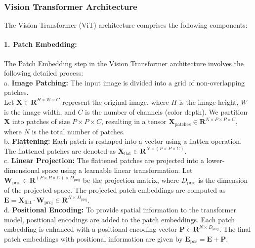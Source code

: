 \subsubsection{Vision Transformer Architecture}

The Vision Transformer (ViT) architecture comprises the following components:
\item
\paragraph{1. Patch Embedding:}
The Patch Embedding step in the Vision Transformer architecture involves the following detailed process:
\\

\noindent a. \textbf{Image Patching:} The input image is divided into a grid of non-overlapping patches.\\
Let $\mathbf{X} \in \mathbf{R}^{H \times W \times C}$ represent the original image, where $H$ is the image height, $W$ is the image width, and $C$ is the number of channels (color depth). We partition $\mathbf{X}$ into patches of size $P \times P \times C$, resulting in a tensor $\mathbf{X}_\text{patches} \in \mathbf{R}^{N \times P \times P \times C}$, where $N$ is the total number of patches.
\\

\noindent b. \textbf{Flattening:} Each patch is reshaped into a vector using a flatten operation. The flattened patches are denoted as $\mathbf{X}_\text{flat} \in \mathbf{R}^{N \times (P \times P \times C)}$.
\\

\noindent c. \textbf{Linear Projection:} The flattened patches are projected into a lower-dimensional space using a learnable linear transformation. Let $\mathbf{W}_\text{proj} \in \mathbf{R}^{(P \times P \times C) \times D_\text{proj}}$ be the projection matrix, where $D_\text{proj}$ is the dimension of the projected space. The projected patch embeddings are computed as $\mathbf{E} = \mathbf{X}_\text{flat} \cdot \mathbf{W}_\text{proj} \in \mathbf{R}^{N \times D_\text{proj}}$.
\\

\noindent d. \textbf{Positional Encoding:} To provide spatial information to the transformer model, positional encodings are added to the patch embeddings. Each patch embedding is enhanced with a positional encoding vector $\mathbf{P} \in \mathbf{R}^{N \times D_\text{proj}}$. The final patch embeddings with positional information are given by $\mathbf{E}_\text{pos} = \mathbf{E} + \mathbf{P}$.

